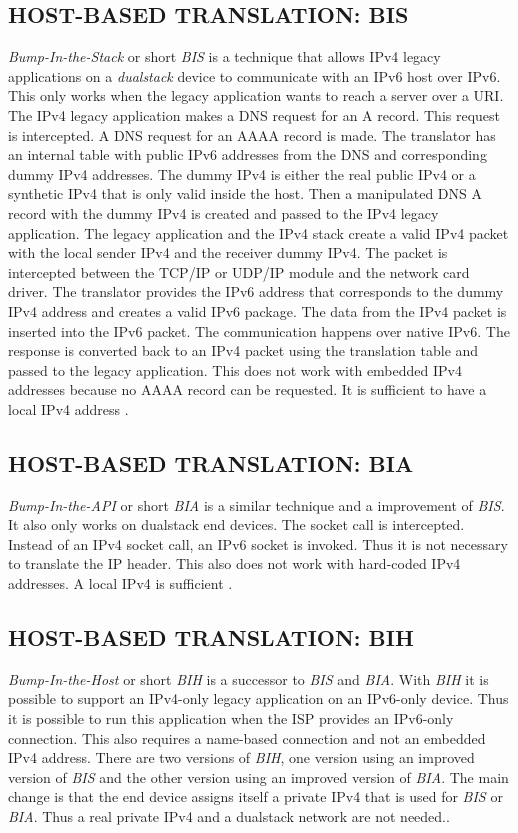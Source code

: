 \documentclass[format=sigconf, natbib=true, nonacm=true]{acmart}
\begin{document}
    \subsection{HOST-BASED TRANSLATION: BIS}
    \textit{Bump-In-the-Stack} or short \textit{BIS} is a technique that allows IPv4 legacy applications on a \textit{dualstack} device to communicate with an IPv6 host over IPv6. This only works when the legacy application wants to reach a server over a URI. The IPv4 legacy application makes a DNS request for an A record. This request is intercepted. A DNS request for an AAAA record is made. The translator has an internal table with public IPv6 addresses from the DNS and corresponding dummy IPv4 addresses. The dummy IPv4 is either the real public IPv4 or a synthetic IPv4 that is only valid inside the host. Then a manipulated DNS A record with the dummy IPv4 is created and passed to the IPv4 legacy application. The legacy application and the IPv4 stack create a valid IPv4 packet with the local sender IPv4 and the receiver dummy IPv4. The packet is intercepted between the TCP/IP or UDP/IP module and the network card driver. The translator provides the IPv6 address that corresponds to the dummy IPv4 address and creates a valid IPv6 package. The data from the IPv4 packet is inserted into the IPv6 packet. The communication happens over native IPv6. The response is converted back to an IPv4 packet using the translation table and passed to the legacy application. This does not work with embedded IPv4 addresses because no AAAA record can be requested. It is sufficient to have a local IPv4 address\cite{8716482} \cite{rfc2767}.
    \subsection{HOST-BASED TRANSLATION: BIA}
    \textit{Bump-In-the-API} or short \textit{BIA} is a similar technique and a improvement of \textit{BIS}. It also only works on dualstack end devices. The socket call is intercepted. Instead of an IPv4 socket call, an IPv6 socket is invoked. Thus it is not necessary to translate the IP header. This also does not work with hard-coded IPv4 addresses. A local IPv4 is sufficient\cite{8716482} \cite{rfc3338}.
    \subsection{HOST-BASED TRANSLATION: BIH}
    \textit{Bump-In-the-Host} or short \textit{BIH} is a successor to \textit{BIS} and \textit{BIA}. With \textit{BIH} it is possible to support an IPv4-only legacy application on an IPv6-only device. Thus it is possible to run this application when the ISP provides an IPv6-only connection. This also requires a name-based connection and not an embedded IPv4 address. There are two versions of \textit{BIH}, one version using an improved version of \textit{BIS} and the other version using an improved version of \textit{BIA}. The main change is that the end device assigns itself a private IPv4 that is used for \textit{BIS} or \textit{BIA}. Thus a real private IPv4 and a dualstack network are not needed.\cite{8716482}\cite{rfc6535}. 
\end{document}
